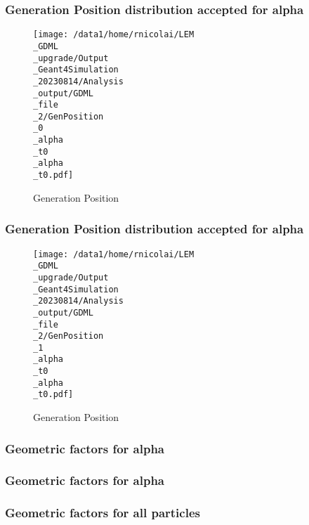 \documentclass[8pt]{beamer}
\begin{document}
            \begin{frame}
                \frametitle{Generation Position distribution accepted for alpha}
            
        \begin{figure}[h]
            \centering
            \texttt{[image: /data1/home/rnicolai/LEM\\\_GDML\\\_upgrade/Output\\\_Geant4Simulation\\\_20230814/Analysis\\\_output/GDML\\\_file\\\_2/GenPosition\\\_0\\\_alpha\\\_t0\\\_alpha\\\_t0.pdf]}
            \caption{Generation Position}
        \end{figure}
        
            \end{frame}
            
            \begin{frame}
                \frametitle{Generation Position distribution accepted for alpha}
            
        \begin{figure}[h]
            \centering
            \texttt{[image: /data1/home/rnicolai/LEM\\\_GDML\\\_upgrade/Output\\\_Geant4Simulation\\\_20230814/Analysis\\\_output/GDML\\\_file\\\_2/GenPosition\\\_1\\\_alpha\\\_t0\\\_alpha\\\_t0.pdf]}
            \caption{Generation Position}
        \end{figure}
        
            \end{frame}
            
            \begin{frame}
                \frametitle{Geometric factors for alpha}
            
            \end{frame}
            
            \begin{frame}
                \frametitle{Geometric factors for alpha}
            
            \end{frame}
            
            \begin{frame}
                \frametitle{Geometric factors for all particles}
            
            \end{frame}
            
        
\end{document}
